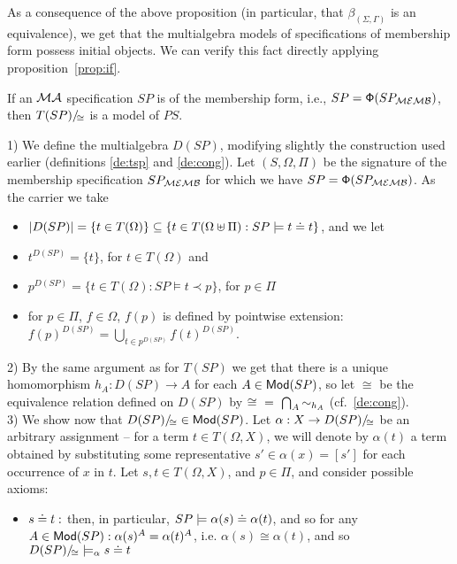 \documentclass[10pt]{article}
\begin{document}
As a consequence of the above proposition (in particular, that
$\beta_{(\Sigma,\Gamma)}$ is an equivalence), we get that the multialgebra
models of specifications of membership form possess initial objects. 
We can verify this fact directly applying proposition~\ref{prop:if}.
\begin{proposition}
If an ${\mathcal{MA}}$ specification $SP$ is of the membership form, i.e.,
$SP={\sf {\Phi}}(SP_{{\mathcal{MEMB}}})$, then ${T(SP)/\!_{\cong}}$ is a model of $PS$.
\end{proposition}
%
\begin{PROOF}
1) We define the multialgebra $D(SP)$, modifying slightly the construction used
earlier (definitions \ref{de:tsp} and \ref{de:cong}). 
Let $(S,\Omega,\Pi)$ be the signature of the membership specification $SP_{{\mathcal{MEMB}}}$ for
which we have $SP={\sf {\Phi}}(SP_{{\mathcal{MEMB}}})$. 
As the carrier we take 
\begin{itemize}\MyLPar
\item $|D(SP)|= \{ t \in T(\Omega) \}\subseteq\{t\in
T(\Omega\uplus\Pi):SP\models t\mathrel{\dot{=} } t\}$, and we let
\item $t^{D(SP)} = \{t\} $, for $t \in T(\Omega)$ and 
\item $p^{D(SP)} = \{ t \in 
T(\Omega): SP \models t \prec p \}$, for $p \in \Pi$
\item for $p\in\Pi$, $f\in\Omega$, $f(p)$ is defined by pointwise
extension: $f(p)^{D(SP)}=\bigcup_{t\in p^{D(SP)}} f(t)^{D(SP)}$.
\end{itemize}
2) By the same argument as 
for $T(SP)$ we get that there is a unique homomorphism $h_A: D(SP) \to A$ for 
each $A \in {\sf {Mod}}(SP)$, so let $\cong$ be the equivalence relation defined on 
$D(SP)$ by ${\cong}\ =\ {\bigcap_A{ \sim_{h_A}}}$ (cf.~\ref{de:cong}). 
\\[1ex]
3) We show now that $D(SP)/\!_{\cong}\in{\sf {Mod}}(SP)$. 
Let $\alpha:X \to 
D(SP)/\!_{\cong}$ be an arbitrary assignment -- for a term $t\in
T(\Omega,X)$, we will denote by $\alpha(t)$ a term obtained by substituting some
representative $s'\in \alpha(x)=[s']$ for each occurrence of $x$ in $t$.
Let $s,t\in T(\Omega,X)$, and $p\in\Pi$, and consider possible axioms:
	\begin{itemize}
	\item $s\mathrel{\dot{=} } t:$ then, in particular, $SP \models \alpha(s) \mathrel{\dot{=} }
	\alpha(t)$, and so
for any $A\in{\sf {Mod}}(SP): \alpha (s)^A = \alpha (t)^A$, i.e. $\alpha (s) 
{\cong} \alpha (t)$, and so ${D(SP)/\!_{\cong}} \models_{\alpha} s \mathrel{\dot{=} } t$

\end{itemize}
\end{PROOF}
\end{document}
